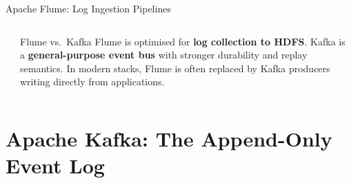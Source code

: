 \documentclass[aspectratio=169,10pt]{beamer}
\begin{document}
\begin{frame}{Apache Flume: Log Ingestion Pipelines}
\begin{columns}[T]
\begin{center}
      \end{center}
      \vspace{4pt}
      \begin{alertblock}{Flume vs.\ Kafka}
        \small Flume is optimised for \textbf{log collection to HDFS}.  Kafka is a \textbf{general-purpose event bus} with stronger durability and replay semantics.  In modern stacks, Flume is often replaced by Kafka producers writing directly from applications.
      \end{alertblock}
  \end{columns}
\end{frame}

\section{Apache Kafka: The Append-Only Event Log}
\end{document}
